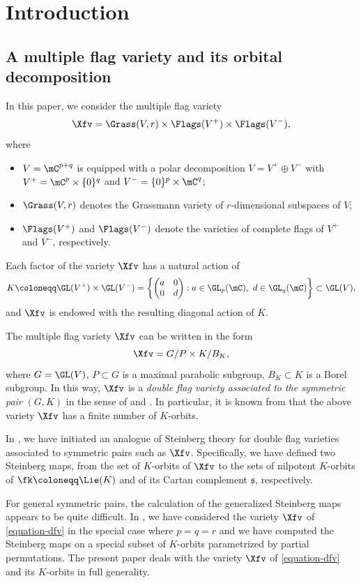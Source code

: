 \section{Introduction}

\subsection{A multiple flag variety and its orbital decomposition}
\label{section-1.1}
In this paper, we consider the multiple flag variety
\begin{equation}
\label{equation-dfv}
\Xfv=\Grass(V,r)\times \Flags(V^+)\times \Flags(V^-),
\end{equation}
where
\begin{itemize}
\item $V=\mC^{p+q}$ is equipped with a polar decomposition $V=V^+\oplus V^-$ with $V^+=\mC^p\times\{0\}^q$ and $V^-=\{0\}^p\times \mC^q$;
\item $\Grass(V,r)$ denotes the Grassmann variety of $r$-dimensional subspaces of $V$;
\item $\Flags(V^+)$ and $\Flags(V^-)$ denote the varieties of complete flags of $V^+$ and $V^-$, respectively.
\end{itemize}
Each factor of the variety $\Xfv$ has a natural action of
\[
K\coloneqq \GL(V^+)\times \GL(V^-)=\left\{\begin{pmatrix} a & 0\\ 0 & d \end{pmatrix}:a\in\GL_p(\mC),\ d\in\GL_q(\mC)\right\}\subset\GL(V),
\]
and $\Xfv$ is endowed with the resulting diagonal action of $K$.

The multiple flag variety $\Xfv$ can be written in the form
\[
\Xfv=G/P\times K/B_K,
\]
where $G=\GL(V)$, $P\subset G$ is a maximal parabolic subgroup, $B_K\subset K$ is a Borel subgroup.
In this way, $\Xfv$ is a \textit{double flag variety associated to the symmetric pair}
$(G,K)$
in the sense of \cite{NO} and \cite{HNOO}.
In particular, it is known from \cite{NO} that the above variety $\Xfv$ has a finite number of $K$-orbits.

In \cite{FN1,FN2}, we have initiated an analogue of Steinberg theory for double flag varieties associated to symmetric pairs such as $\Xfv$.
Specifically, we have defined two Steinberg maps, from the set of $K$-orbits of $\Xfv$ to the sets of nilpotent $K$-orbits of $\fk\coloneqq \Lie(K)$ and of its Cartan complement $\mathfrak{s}$, respectively.

For general symmetric pairs, the calculation of the generalized Steinberg maps appears to be quite difficult.
In \cite{FN2}, we have considered the variety $\Xfv$ of \eqref{equation-dfv} in the special case where $p=q=r$ and we have computed the Steinberg maps on a special subset of $K$-orbits parametrized by partial permutations.
The present paper deals with the variety $\Xfv$ of \eqref{equation-dfv} and its $K$-orbits in full generality.

